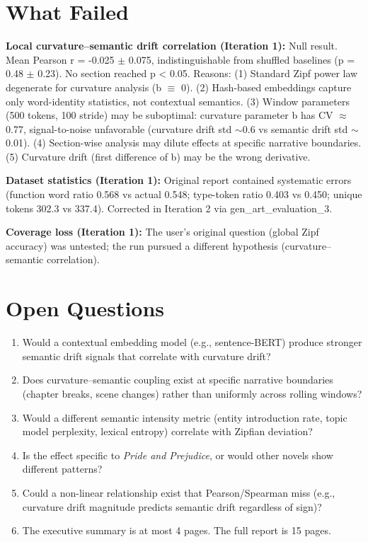 \documentclass[11pt,letterpaper]{article}
\begin{document}
\section{What Failed}

\textbf{Local curvature--semantic drift correlation (Iteration 1):} Null result. Mean Pearson r = -0.025 $\pm$ 0.075, indistinguishable from shuffled baselines (p = 0.48 $\pm$ 0.23). No section reached p < 0.05. Reasons: (1) Standard Zipf power law degenerate for curvature analysis (b $\equiv$ 0). (2) Hash-based embeddings capture only word-identity statistics, not contextual semantics. (3) Window parameters (500 tokens, 100 stride) may be suboptimal: curvature parameter b has CV $\approx$ 0.77, signal-to-noise unfavorable (curvature drift std $\sim$0.6 vs semantic drift std $\sim$0.01). (4) Section-wise analysis may dilute effects at specific narrative boundaries. (5) Curvature drift (first difference of b) may be the wrong derivative.

\textbf{Dataset statistics (Iteration 1):} Original report contained systematic errors (function word ratio 0.568 vs actual 0.548; type-token ratio 0.403 vs 0.450; unique tokens 302.3 vs 337.4). Corrected in Iteration 2 via gen\_art\_evaluation\_3.

\textbf{Coverage loss (Iteration 1):} The user's original question (global Zipf accuracy) was untested; the run pursued a different hypothesis (curvature--semantic correlation).

\section{Open Questions}

\begin{enumerate}
\item Would a contextual embedding model (e.g., sentence-BERT) produce stronger semantic drift signals that correlate with curvature drift?
\item Does curvature--semantic coupling exist at specific narrative boundaries (chapter breaks, scene changes) rather than uniformly across rolling windows?
\item Would a different semantic intensity metric (entity introduction rate, topic model perplexity, lexical entropy) correlate with Zipfian deviation?
\item Is the effect specific to \textit{Pride and Prejudice}, or would other novels show different patterns?
\item Could a non-linear relationship exist that Pearson/Spearman miss (e.g., curvature drift magnitude predicts semantic drift regardless of sign)?
\item The executive summary is at most 4 pages. The full report is 15 pages.
\end{enumerate}
\end{document}
